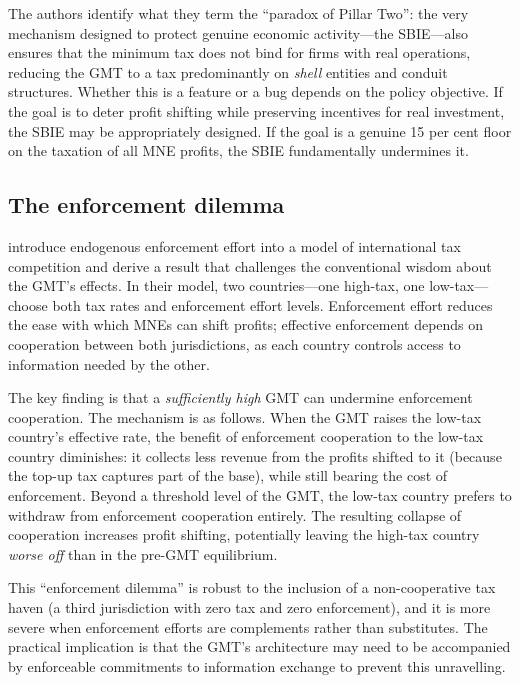 \documentclass[12pt,a4paper]{article}
\begin{document}
The authors identify what they term the ``paradox of Pillar Two'': the very mechanism designed to protect genuine economic activity---the SBIE---also ensures that the minimum tax does not bind for firms with real operations, reducing the GMT to a tax predominantly on \emph{shell} entities and conduit structures.
Whether this is a feature or a bug depends on the policy objective.
If the goal is to deter profit shifting while preserving incentives for real investment, the SBIE may be appropriately designed.
If the goal is a genuine 15 per cent floor on the taxation of all MNE profits, the SBIE fundamentally undermines it.

\subsection{The enforcement dilemma}

\textcite{hindriks2025} introduce endogenous enforcement effort into a model of international tax competition and derive a result that challenges the conventional wisdom about the GMT's effects.
In their model, two countries---one high-tax, one low-tax---choose both tax rates and enforcement effort levels.
Enforcement effort reduces the ease with which MNEs can shift profits; effective enforcement depends on cooperation between both jurisdictions, as each country controls access to information needed by the other.

The key finding is that a \emph{sufficiently high} GMT can undermine enforcement cooperation.
The mechanism is as follows.
When the GMT raises the low-tax country's effective rate, the benefit of enforcement cooperation to the low-tax country diminishes: it collects less revenue from the profits shifted to it (because the top-up tax captures part of the base), while still bearing the cost of enforcement.
Beyond a threshold level of the GMT, the low-tax country prefers to withdraw from enforcement cooperation entirely.
The resulting collapse of cooperation increases profit shifting, potentially leaving the high-tax country \emph{worse off} than in the pre-GMT equilibrium.

This ``enforcement dilemma'' is robust to the inclusion of a non-cooperative tax haven (a third jurisdiction with zero tax and zero enforcement), and it is more severe when enforcement efforts are complements rather than substitutes.
The practical implication is that the GMT's architecture may need to be accompanied by enforceable commitments to information exchange to prevent this unravelling.
\end{document}
